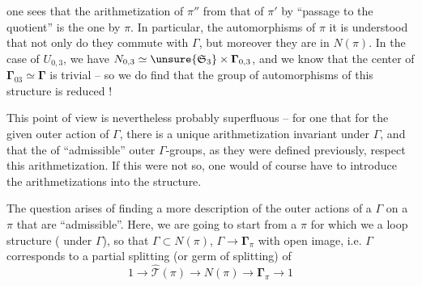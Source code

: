 
one sees that the arithmetization of $\pi''$  from that of $\pi'$ by ``passage to the quotient'' is the one  by $\pi$.  In particular,  the  automorphisms of $\pi$ it is understood that  not only do they commute with $\Gamma$, but moreover they are in $N(\pi)$.  In the case of $U_{0,3}$, we have $N_{0,3}\simeq\unsure{\mathfrak S_3}\times\boldsymbol{\Gamma}_{0,3}$, and we know that the center of $\boldsymbol{\Gamma}_{03}\simeq\boldsymbol{\Gamma}$ is trivial -- so we do find that the group of automorphisms of this structure is reduced  !

This point of view is nevertheless probably superfluous -- for one  that for the given outer action of $\Gamma$, there is a unique arithmetization invariant under $\Gamma$, and that the   of ``admissible'' outer $\Gamma$-groups, as they were defined previously,  respect this arithmetization. If this were not so, one would of course have to introduce the arithmetizations into the structure.




The question arises of finding a more   description of the outer actions of a $\Gamma$ on a $\pi$ that are ``admissible''.  Here, we are going to start from a $\pi$ for which we  a loop structure  ( under $\Gamma$), so  that $\Gamma\subset N(\pi)$, $\Gamma\longrightarrow\boldsymbol{\Gamma}_\pi$  with open image,  i.e. $\Gamma$ corresponds to a partial splitting (or germ of splitting) of 
\[
1\longrightarrow\widehat{\mathcal T}(\pi)\longrightarrow N(\pi)\longrightarrow\boldsymbol{\Gamma}_\pi\longrightarrow1
\]

